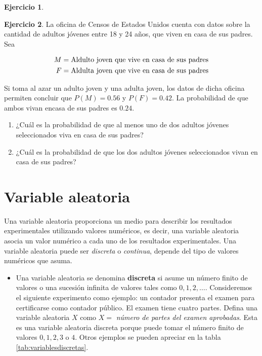 \documentclass[
  11pt,
]{book}
\providecommand{\tightlist}{%
  \setlength{\itemsep}{0pt}\setlength{\parskip}{0pt}}
\theoremstyle{definition}
\theoremstyle{definition}
\theoremstyle{definition}
\newtheorem{exercise}{Ejercicio}[chapter]
\theoremstyle{definition}
\theoremstyle{remark}
\begin{document}
\begin{enumerate}
\begin{exercise}
  \end{exercise}

  \begin{exercise}

  La oficina de Censos de Estados Unidos cuenta con datos sobre la cantidad de adultos jóvenes entre 18 y 24 años, que viven en casa de sus padres. Sea

  \begin{equation}
  \notag
  \begin{split}
  M &= \text{Aldulto joven que vive en casa de sus padres}\\
  F &= \text{Aldulta joven que vive en casa de sus padres}\\
  \end{split}
  \end{equation}

  Si toma al azar un adulto joven y una adulta joven, los datos de dicha oficina permiten concluir que \(P(M) = 0.56\) y \(P(F) = 0.42\). La probabilidad de que ambos vivan encasa de sus padres es \(0.24\).

  \begin{enumerate}
  \def\labelenumii{\alph{enumii}.}
  \tightlist
  \item
    ¿Cuál es la probabilidad de que al menos uno de dos adultos jóvenes seleccionados viva en casa de sus padres?
  \item
    ¿Cuál es la probabilidad de que los dos adultos jóvenes seleccionados vivan en casa de sus padres?
  \end{enumerate}

  \end{exercise}
\end{enumerate}

\section{Variable aleatoria}\label{probabilidad-variable-aleatoria}

Una variable aleatoria proporciona un medio para describir los resultados experimentales utilizando valores numéricos, es decir, una variable aleatoria asocia un valor numérico a cada uno de los resultados experimentales. Una variable aleatoria puede ser \emph{discreta} o \emph{continua}, depende del tipo de valores numéricos que asuma. \citep[página 187]{anderson}

\begin{itemize}
\tightlist
\item
  Una variable aleatoria se denomina \textbf{discreta} si asume un número finito de valores o una sucesión infinita de valores tales como \(0,1,2,\ldots\). Consideremos el siguiente experimento como ejemplo: un contador presenta el examen para certificarse como contador público. El examen tiene cuatro partes. Defina una variable aleatoria \(X\) como \(X =\) \emph{número de partes del examen aprobadas}. Esta es una variable aleatoria discreta porque puede tomar el número finito de valores \(0,1,2,3\) o \(4\). Otros ejemplos se pueden apreciar en la tabla \ref{tab:variablesdiscretas}.
\end{itemize}
\end{document}
